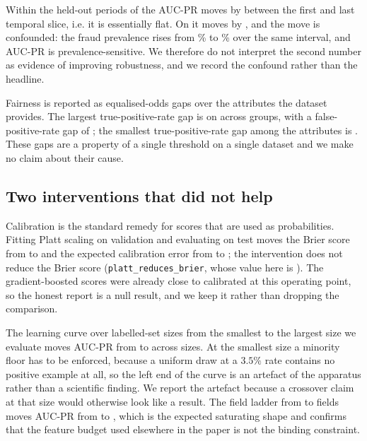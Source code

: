 Within the held-out periods of \DatasetIeee{} the AUC-PR moves by \IeeeDrift{}
between the first and last temporal slice, i.e. it is essentially flat. On
\DatasetBaf{} it moves by \BafDrift{}, and the move is confounded: the fraud
prevalence rises from \BafPrevLo\% to \BafPrevHi\% over the same interval, and
AUC-PR is prevalence-sensitive. We therefore do not interpret the second number as
evidence of improving robustness, and we record the confound rather than the
headline.

Fairness is reported as equalised-odds gaps \cite{hardt2016equality} over the
\FairAttrs{} attributes the dataset provides. The largest true-positive-rate gap
is \FairTprGap{} on \texttt{\FairAttr} across \FairGroups{} groups, with a
false-positive-rate gap of \FairFprGap; the smallest true-positive-rate gap among
the attributes is \FairMinTprGap. These gaps are a property of a single threshold
on a single dataset and we make no claim about their cause.

\subsection{Two interventions that did not help}

Calibration is the standard remedy for scores that are used as probabilities.
Fitting Platt scaling on validation and evaluating on test moves the Brier score
from \BrierPre{} to \BrierPost{} and the expected calibration error from \EcePre{}
to \EcePost; the intervention does not reduce the Brier score
(\texttt{platt\_reduces\_brier}, whose value here is \PlattImproves). The
gradient-boosted scores were already close to calibrated at this operating point,
so the honest report is a null result, and we keep it rather than dropping the
comparison.

The learning curve over labelled-set sizes from the smallest to the largest size
we evaluate moves AUC-PR from \CurveSmallAucPr{} to \CurveLargeAucPr{} across
\CurveSizes{} sizes. At the smallest size a minority floor has to be enforced,
because a uniform draw at a $3.5\%$ rate contains no positive example at all, so
the left end of the curve is an artefact of the apparatus rather than a scientific
finding.
We report the artefact because a crossover claim at that size would otherwise look
like a result. The field ladder from \LadderSmall{} to \LadderLarge{} fields moves
AUC-PR from \LadderSmallestAucPr{} to \LadderLargestAucPr, which is the expected
saturating shape and confirms that the feature budget used elsewhere in the paper
is not the binding constraint.

